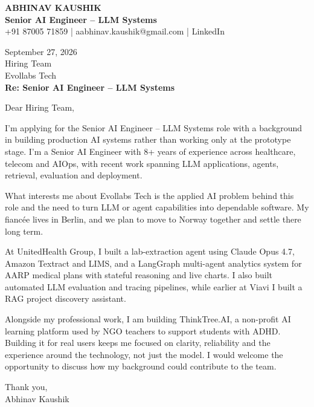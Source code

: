 \documentclass[10pt,a4paper]{article}
\begin{document}
\begin{center}
{\Large\bfseries ABHINAV KAUSHIK}\\[2pt]
{\bfseries Senior AI Engineer – LLM Systems}\\[2pt]
+91 87005 71859 \quad | \quad aabhinav.kaushik@gmail.com \quad | \quad LinkedIn
\end{center}
\vspace{8pt}
September 27, 2026\\[6pt]
Hiring Team\\
Evollabs Tech\\[4pt]
\textbf{Re: Senior AI Engineer – LLM Systems}

Dear Hiring Team,

I’m applying for the Senior AI Engineer – LLM Systems role with a background in building production AI systems rather than working only at the prototype stage. I’m a Senior AI Engineer with 8+ years of experience across healthcare, telecom and AIOps, with recent work spanning LLM applications, agents, retrieval, evaluation and deployment.

What interests me about Evollabs Tech is the applied AI problem behind this role and the need to turn LLM or agent capabilities into dependable software. My fiancée lives in Berlin, and we plan to move to Norway together and settle there long term.

At UnitedHealth Group, I built a lab-extraction agent using Claude Opus 4.7, Amazon Textract and LIMS, and a LangGraph multi-agent analytics system for AARP medical plans with stateful reasoning and live charts. I also built automated LLM evaluation and tracing pipelines, while earlier at Viavi I built a RAG project discovery assistant.

Alongside my professional work, I am building ThinkTree.AI, a non-profit AI learning platform used by NGO teachers to support students with ADHD. Building it for real users keeps me focused on clarity, reliability and the experience around the technology, not just the model. I would welcome the opportunity to discuss how my background could contribute to the team.

Thank you,\\
Abhinav Kaushik
\end{document}

